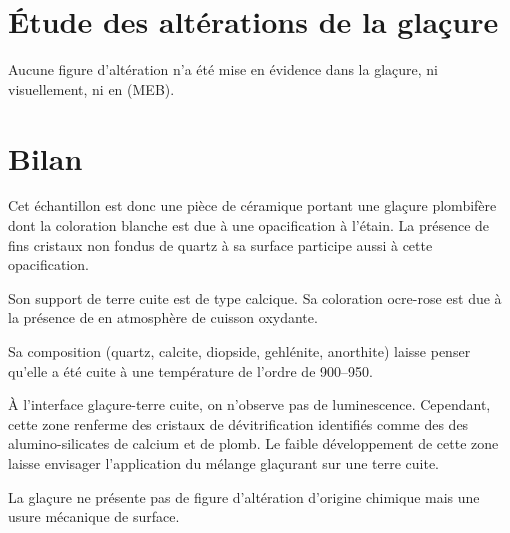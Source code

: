 \section{Étude des altérations de la glaçure}

Aucune figure d'altération n'a été mise en évidence dans la glaçure, 
ni visuellement, ni en \MEB[ie] (MEB).


\section{Bilan}

Cet échantillon est donc une pièce de céramique portant une glaçure 
plombifère dont la coloration blanche est due à une opacification à 
l'étain. La présence de fins cristaux non fondus de quartz à sa 
surface participe aussi à cette opacification.

Son support de terre cuite est de type calcique. Sa coloration 
ocre-rose est due à la présence de  en atmosphère de 
cuisson oxydante.

Sa composition \cristallo (quartz, calcite, diopside, gehlénite, 
anorthite) laisse penser qu'elle a été cuite à une température de 
l'ordre de \SIrange[range-phrase=\ à\ ]{900}{950}{\degC}.

À l'interface glaçure-terre cuite, on n'observe pas de luminescence. 
Cependant, cette zone renferme des cristaux de dévitrification 
identifiés comme des des alumino-silicates de calcium et de plomb. 
Le faible développement de cette zone laisse envisager l'application 
du mélange glaçurant sur une terre cuite.

La glaçure ne présente pas de figure d'altération d'origine chimique 
mais une usure mécanique de surface.